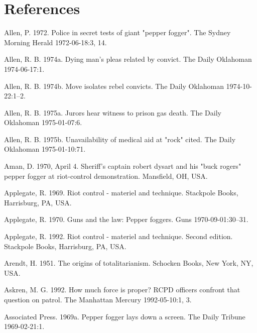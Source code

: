 \documentclass[
  11pt,
]{krantz}
\newlength{\cslhangindent}
\newlength{\cslentryspacingunit} %
\newenvironment{CSLReferences}[2] %
 {%
  \setlength{\parindent}{0pt}
  \ifodd #1
  \let\oldpar\par
  \def\par{\hangindent=\cslhangindent\oldpar}
  \fi
  \setlength{\parskip}{#2\cslentryspacingunit}
 }%
 {}
\begin{document}
\hypertarget{References}{%
\chapter*{References}\label{References}}


\hypertarget{refs}{}
\begin{CSLReferences}{1}{0}
\leavevmode{}%
Allen, P. 1972. Police in secret tests of giant "pepper fogger". The Sydney Morning Herald 1972-06-18:3, 14.

\leavevmode{}%
Allen, R. B. 1974a. Dying man's pleas related by convict. The Daily Oklahoman 1974-06-17:1.

\leavevmode{}%
Allen, R. B. 1974b. Move isolates rebel convicts. The Daily Oklahoman 1974-10-22:1--2.

\leavevmode{}%
Allen, R. B. 1975a. Jurors hear witness to prison gas death. The Daily Oklahoman 1975-01-07:6.

\leavevmode{}%
Allen, R. B. 1975b. Unavailability of medical aid at "rock" cited. The Daily Oklahoman 1975-01-10:71.

\leavevmode{}%
Aman, D. 1970, April 4. Sheriff's captain robert dysart and his "buck rogers" pepper fogger at riot-control demonstration. Mansfield, OH, USA.

\leavevmode{}%
Applegate, R. 1969. Riot control - materiel and technique. Stackpole Books, Harrisburg, PA, USA.

\leavevmode{}%
Applegate, R. 1970. Guns and the law: Pepper foggers. Guns 1970-09-01:30--31.

\leavevmode{}%
Applegate, R. 1992. Riot control - materiel and technique. Second edition. Stackpole Books, Harrisburg, PA, USA.

\leavevmode{}%
Arendt, H. 1951. The origins of totalitarianism. Schocken Books, New York, NY, USA.

\leavevmode{}%
Askren, M. G. 1992. How much force is proper? RCPD officers confront that question on patrol. The Manhattan Mercury 1992-05-10:1, 3.

\leavevmode{}%
Associated Press. 1969a. Pepper fogger lays down a screen. The Daily Tribune 1969-02-21:1.


\end{CSLReferences}
\end{document}
